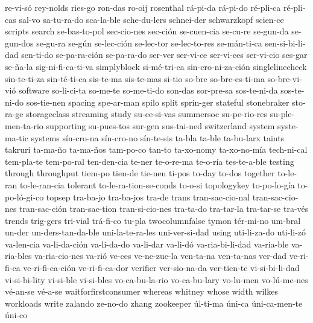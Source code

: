 {  re-vi-só rey-nolds ries-go ron-das ro-oij rosenthal rá-pi-da rá-pi-do
  ré-pli-ca ré-pli-cas sal-vo sa-tu-ra-do sca-la-ble sche-du-lers
  schnei-der schwarzkopf scien-ce scripts search se-bas-to-pol
  sec-cio-nes sec-ción se-cuen-cia se-cu-re se-gun-da se-gun-dos
  se-gu-ra se-gún se-lec-ción se-lec-tor se-lec-to-res se-mán-ti-ca
  sen-si-bi-li-dad sen-ti-do se-pa-ra-ción se-pa-ra-do ser-ver
  ser-vi-ce ser-vi-ces ser-vi-cio ses-gar se-ña-la sig-ni-fi-ca-ti-va
  simplyblock si-mé-tri-ca sin-cro-ni-za-ción singlelinecheck
  sin-te-ti-za sin-té-ti-ca sis-te-ma sis-te-mas si-tio so-bre
  so-bre-es-ti-ma so-bre-vi-vió software so-li-ci-ta so-me-te
  so-me-ti-do son-das sor-pre-sa sos-te-ni-da sos-te-ni-do sos-tie-nen
  spacing spe-ar-man spilo split sprin-ger stateful stonebraker
  sto-ra-ge storageclass streaming study su-ce-si-vas summersoc
  su-pe-rio-res su-ple-men-ta-rio supporting su-pues-tos sur-gen
  sus-tai-ned switzerland system syste-ma-tic systems sín-cro-na
  sín-cro-no sín-te-sis ta-bla ta-ble ta-bu-larx taints takruri
  ta-ma-ño ta-ma-ños tam-po-co tan-to ta-xo-nomy ta-xo-no-mía
  tech-ni-cal tem-pla-te tem-po-ral ten-den-cia te-ner te-o-re-ma
  te-o-ría tes-te-a-ble testing through throughput tiem-po tien-de
  tie-nen ti-pos to-day to-dos together to-le-ran to-le-ran-cia
  tolerant to-le-ra-tion-se-conds to-o-si topologykey to-po-lo-gía
  to-po-ló-gi-co topsep tra-ba-jo tra-ba-jos tra-de trans
  tran-sac-cio-nal tran-sac-cio-nes tran-sac-ción tran-sac-tion
  tran-si-cio-nes tra-ta-do tra-tar-la tra-tar-se tra-vés trends
  trig-gers tri-vial trá-fi-co tu-pla twocolumnfalse tymon tér-mi-no
  um-bral un-der un-ders-tan-da-ble uni-la-te-ra-les uni-ver-si-dad
  using uti-li-za-do uti-li-zó va-len-cia va-li-da-ción va-li-da-do
  va-li-dar va-li-dó va-ria-bi-li-dad va-ria-ble va-ria-bles
  va-ria-cio-nes va-rió ve-ces ve-ne-zue-la ven-ta-na ven-ta-nas
  ver-dad ve-ri-fi-ca ve-ri-fi-ca-ción ve-ri-fi-ca-dor verifier
  ver-sio-na-da ver-tien-te vi-si-bi-li-dad vi-si-bi-lity vi-si-ble
  vi-si-bles vo-ca-bu-la-rio vo-ca-bu-lary vo-lu-men vo-lú-me-nes
  vé-an-se vé-a-se waitforfirstconsumer whereas whitney whose width
  wilkes workloads write zalando ze-no-do zhang zookeeper úl-ti-ma
  úni-ca úni-ca-men-te úni-co
}
